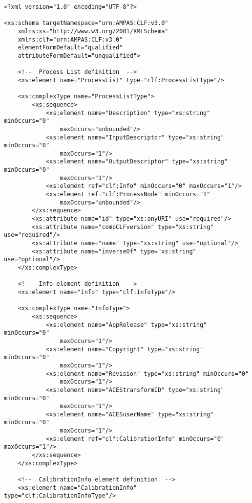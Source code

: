 \label{appendixA}

\lstset{frame=none}
\begin{lstlisting}
<?xml version="1.0" encoding="UTF-8"?>

<xs:schema targetNamespace="urn:AMPAS:CLF:v3.0" 
    xmlns:xs="http://www.w3.org/2001/XMLSchema"
    xmlns:clf="urn:AMPAS:CLF:v3.0" 
    elementFormDefault="qualified"
    attributeFormDefault="unqualified">
    
    <!--  Process List definition  -->
    <xs:element name="ProcessList" type="clf:ProcessListType"/>
    
    <xs:complexType name="ProcessListType">
        <xs:sequence>
            <xs:element name="Description" type="xs:string" minOccurs="0" 
                maxOccurs="unbounded"/>
            <xs:element name="InputDescriptor" type="xs:string" minOccurs="0" 
                maxOccurs="1"/>
            <xs:element name="OutputDescriptor" type="xs:string" minOccurs="0" 
                maxOccurs="1"/>
            <xs:element ref="clf:Info" minOccurs="0" maxOccurs="1"/>
            <xs:element ref="clf:ProcessNode" minOccurs="1" 
                maxOccurs="unbounded"/>
        </xs:sequence>
        <xs:attribute name="id" type="xs:anyURI" use="required"/>
        <xs:attribute name="compCLFversion" type="xs:string" use="required"/>
        <xs:attribute name="name" type="xs:string" use="optional"/>
        <xs:attribute name="inverseOf" type="xs:string" use="optional"/>
    </xs:complexType>
    
    <!--  Info element definition  -->
    <xs:element name="Info" type="clf:InfoType"/>
    
    <xs:complexType name="InfoType">
        <xs:sequence>
            <xs:element name="AppRelease" type="xs:string" minOccurs="0" 
                maxOccurs="1"/>
            <xs:element name="Copyright" type="xs:string" minOccurs="0" 
                maxOccurs="1"/>
            <xs:element name="Revision" type="xs:string" minOccurs="0" 
                maxOccurs="1"/>            
            <xs:element name="ACEStransformID" type="xs:string" minOccurs="0" 
                maxOccurs="1"/>
            <xs:element name="ACESuserName" type="xs:string" minOccurs="0" 
                maxOccurs="1"/>
            <xs:element ref="clf:CalibrationInfo" minOccurs="0" maxOccurs="1"/>
        </xs:sequence>
    </xs:complexType>
    
    <!--  CalibrationInfo element definition  -->
    <xs:element name="CalibrationInfo" type="clf:CalibrationInfoType"/>
    

\end{lstlisting}
